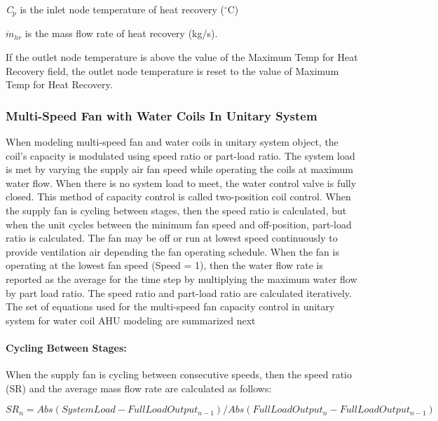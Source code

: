 \emph{C\(_{p}\)} is the inlet node temperature of heat recovery (\(^{\circ}\)C)

\({\dot m_{hr}}\) is the mass flow rate of heat recovery (kg/s).

If the outlet node temperature is above the value of the Maximum Temp for Heat Recovery field, the outlet node temperature is reset to the value of Maximum Temp for Heat Recovery.

\subsubsection{Multi-Speed Fan with Water Coils In Unitary System}\label{multi-speed-fan-with-water-coils-in-unitary-system}

When modeling multi-speed fan and water coils in unitary system object, the coil's capacity is modulated using speed ratio or part-load ratio. The system load is met by varying the supply air fan speed while operating the coils at maximum water flow. When there is no system load to meet, the water control valve is fully closed. This method of capacity control is called two-position coil control. When the supply fan is cycling between stages, then the speed ratio is calculated, but when the unit cycles between the minimum fan speed and off-position, part-load ratio is calculated. The fan may be off or run at lowest speed continuously to provide ventilation air depending the fan operating schedule. When the fan is operating at the lowest fan speed (Speed = 1), then the water flow rate is reported as the average for the time step by multiplying the maximum water flow by part load ratio. The speed ratio and part-load ratio are calculated iteratively. The set of equations used for the multi-speed fan capacity control in unitary system for water coil AHU modeling are summarized next

\paragraph{Cycling Between Stages:}\label{cycling-between-stages}

When the supply fan is cycling between consecutive speeds, then the speed ratio (SR) and the average mass flow rate are calculated as follows:

\begin{equation}
  {SR_{n}} = Abs({SystemLoad} - {FullLoadOutput_{n-1}}) / Abs({FullLoadOutput_{n}} - {FullLoadOutput_{n-1}})
\end{equation}

